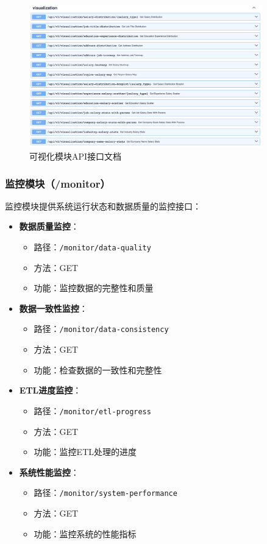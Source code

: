 \begin{figure}[htbp]
    \centering
    \includegraphics[width=0.9\textwidth]{figures/visualization_api.png}
    \caption{可视化模块API接口文档}
    \label{fig:visualization_api}
\end{figure}

\subsubsection{监控模块（/monitor）}
监控模块提供系统运行状态和数据质量的监控接口：

\begin{itemize}
    \item \textbf{数据质量监控}：
    \begin{itemize}
        \item 路径：\texttt{/monitor/data-quality}
        \item 方法：GET
        \item 功能：监控数据的完整性和质量
    \end{itemize}
    
    \item \textbf{数据一致性监控}：
    \begin{itemize}
        \item 路径：\texttt{/monitor/data-consistency}
        \item 方法：GET
        \item 功能：检查数据的一致性和完整性
    \end{itemize}
    
    \item \textbf{ETL进度监控}：
    \begin{itemize}
        \item 路径：\texttt{/monitor/etl-progress}
        \item 方法：GET
        \item 功能：监控ETL处理的进度
    \end{itemize}
    
    \item \textbf{系统性能监控}：
    \begin{itemize}
        \item 路径：\texttt{/monitor/system-performance}
        \item 方法：GET
        \item 功能：监控系统的性能指标
    \end{itemize}
\end{itemize}
